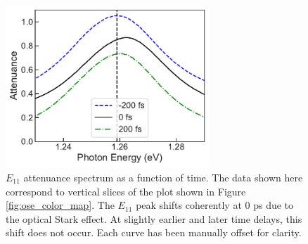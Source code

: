 \begin{figure}[ht]
  \centering
  \includegraphics[height=2.4in]{images/chapter_coherent/ose_time_traces}
  \caption{$E_{11}$ attenuance spectrum as a function of time. The data shown here correspond to vertical slices of the plot shown in Figure \ref{fig:ose_color_map}. The $E_{11}$ peak shifts coherently at 0 ps due to the optical Stark effect. At slightly earlier and later time delays, this shift does not occur. Each curve has been  manually offset for clarity.}
  \label{fig:ose_time_traces}
\end{figure}


